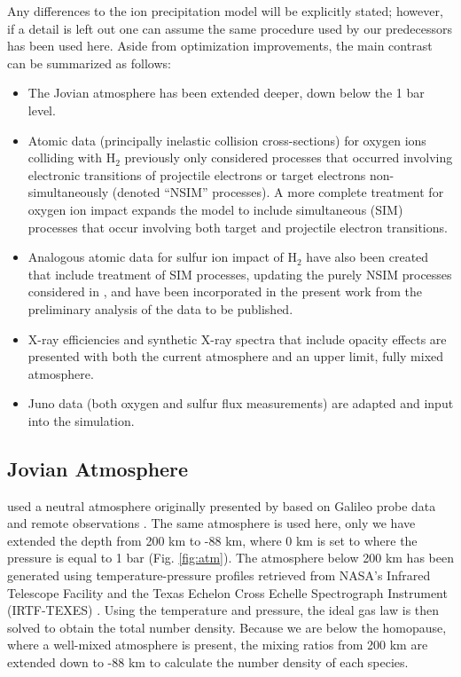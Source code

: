 \documentclass[draft]{agujournal2018}
\begin{document}
Any differences to the ion precipitation model will be explicitly stated; however, if a detail is left out one can assume the same procedure used by our predecessors has been used here.
Aside from optimization improvements, the main contrast can be summarized as follows:
\begin{itemize}
\item The Jovian atmosphere has been extended deeper, down below the 1 bar level.
\item Atomic data (principally inelastic collision cross-sections) for oxygen ions colliding with H$_2$ previously \citep{ozak2013,schultz2017} only considered processes that occurred involving electronic transitions of projectile electrons or target electrons non-simultaneously (denoted ``NSIM'' processes).  A more complete treatment for oxygen \citep{schultz2019} ion impact expands the model to include simultaneous (SIM) processes that occur involving both target and projectile electron transitions.
\item Analogous atomic data for sulfur ion impact of H$_2$ have also been created \citep{gharibnejad2019} that include treatment of SIM processes, updating the purely NSIM processes considered in \citet{ozak2013}, and have been incorporated in the present work from the preliminary analysis of the data to be published.
\item X-ray efficiencies and synthetic X-ray spectra that include opacity effects are presented with both the current atmosphere and an upper limit, fully mixed atmosphere.
\item Juno data (both oxygen and sulfur flux measurements) are adapted and input into the simulation.
\end{itemize}

\subsection{Jovian Atmosphere}
\label{sec:atm}

\citet{houston2018} used a neutral atmosphere originally presented by \citet{maurellis2001} based on Galileo probe data \citep{seiff1996,seiff1997} and remote observations \citep{sada1998}.
The same atmosphere is used here, only we have extended the depth from 200 km to -88 km, where 0 km is set to where the pressure is equal to 1 bar (Fig. \ref{fig:atm}).
The atmosphere below 200 km has been generated using temperature-pressure profiles retrieved from NASA's Infrared Telescope Facility and the Texas Echelon Cross Echelle Spectrograph Instrument (IRTF-TEXES) \citep{sinclair2018}.
Using the temperature and pressure, the ideal gas law is then solved to obtain the total number density.
Because we are below the homopause, where a well-mixed atmosphere is present, the mixing ratios from 200 km are extended down to -88 km to calculate the number density of each species.
\end{document}
